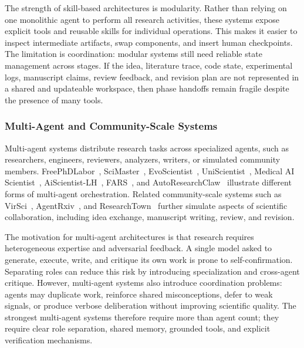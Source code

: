 \documentclass{llmxive}
\begin{document}
The strength of skill-based architectures is modularity. Rather than relying on one monolithic agent to perform all research activities, these systems expose explicit tools and reusable skills for individual operations. This makes it easier to inspect intermediate artifacts, swap components, and insert human checkpoints. The limitation is coordination: modular systems still need reliable state management across stages. If the idea, literature trace, code state, experimental logs, manuscript claims, review feedback, and revision plan are not represented in a shared and updateable workspace, then phase handoffs remain fragile despite the presence of many tools.

\subsubsection{Multi-Agent and Community-Scale Systems}

Multi-agent systems distribute research tasks across specialized agents, such as researchers, engineers, reviewers, analyzers, writers, or simulated community members. FreePhDLabor~\cite{freephdlabor2025}, SciMaster~\cite{scimaster2025}, EvoScientist~\cite{evoscientist2026}, UniScientist~\cite{uniscientist2026}, Medical AI Scientist~\cite{medicalaiscientist2026}, AiScientist-LH~\cite{aiscientistlonghorizon2026}, FARS~\cite{fars2026}, and AutoResearchClaw~\cite{autoresearchclaw2026} illustrate different forms of multi-agent orchestration. Related community-scale systems such as VirSci~\cite{su2024virsci}, AgentRxiv~\cite{schmidgall2025agentrxiv}, and ResearchTown~\cite{researchtown2025} further simulate aspects of scientific collaboration, including idea exchange, manuscript writing, review, and revision.

The motivation for multi-agent architectures is that research requires heterogeneous expertise and adversarial feedback. A single model asked to generate, execute, write, and critique its own work is prone to self-confirmation. Separating roles can reduce this risk by introducing specialization and cross-agent critique. However, multi-agent systems also introduce coordination problems: agents may duplicate work, reinforce shared misconceptions, defer to weak signals, or produce verbose deliberation without improving scientific quality. The strongest multi-agent systems therefore require more than agent count; they require clear role separation, shared memory, grounded tools, and explicit verification mechanisms.
\end{document}
